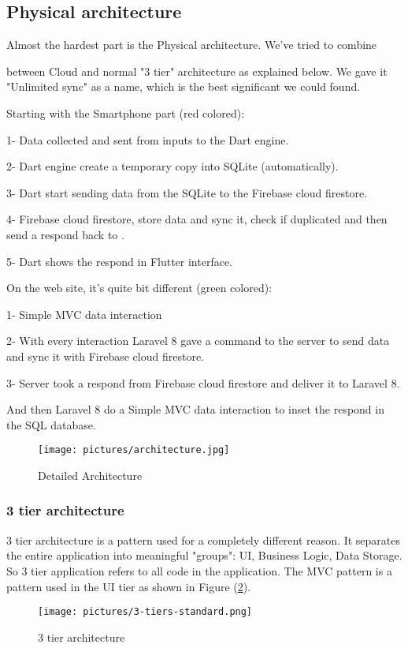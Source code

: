 \documentclass[12pt]{report}
\begin{document}
\subsection{Physical architecture}
Almost the hardest part is the Physical architecture. We've tried to combine 

 between Cloud and normal "3 tier" architecture as explained below.
We gave it "Unlimited sync" as a name, which is the best significant we could found.

Starting with the Smartphone part (red colored):

1- Data collected and sent from inputs to the Dart engine.

2- Dart engine create a temporary copy into SQLite (automatically).

3- Dart start sending data from the SQLite to the Firebase cloud firestore.

4- Firebase cloud firestore, store data and sync it, check if duplicated and then send a respond back to .

5- Dart shows the respond in Flutter interface.               

On the web site, it’s quite bit different (green colored):

1- Simple MVC data interaction

2- With every interaction Laravel 8 gave a command to the server to send data and sync it with Firebase cloud firestore.

3- Server took a respond from Firebase cloud firestore and deliver it to Laravel 8.

And then Laravel 8 do a Simple MVC data interaction to inset the respond in the SQL database.
\begin{figure}
    \centering
    \texttt{[image: pictures/architecture.jpg]}
    \caption{Detailed Architecture}
    \label{fig:detailedachitecture}
\end{figure}
\pagebreak
\subsubsection{3 tier architecture}
3 tier architecture is a pattern used for a completely different reason. It separates the entire application into meaningful "groups": UI, Business Logic, Data Storage. So 3 tier application refers to all code in the application. The MVC pattern is a pattern used in the UI tier as shown in Figure (\ref{fig:tier}).
\begin{figure}[!htbp]

        \centering
    \texttt{[image: pictures/3-tiers-standard.png]}
    \caption{3 tier architecture}
    \label{fig:tier}
\end{figure}
\pagebreak
\end{document}
